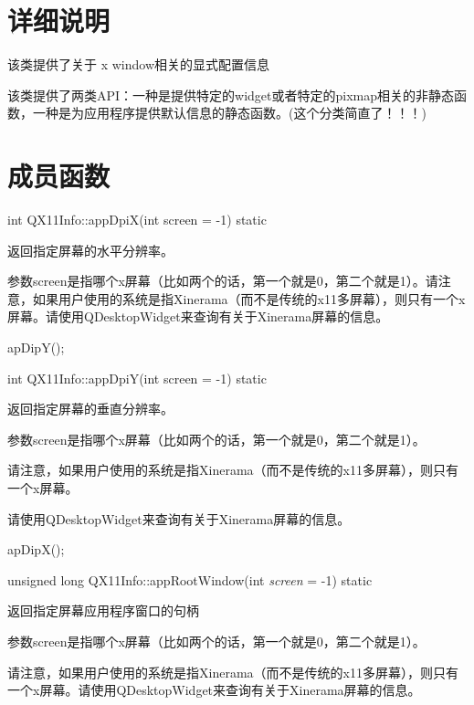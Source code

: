 \section{详细说明}

该类提供了关于 x window相关的显式配置信息

该类提供了两类API：一种是提供特定的widget或者特定的pixmap相关的非静态函数，一种是为应用程序提供默认信息的静态函数。(这个分类简直了！！！)

\section{成员函数}

\begin{itemSpace}
int QX11Info::appDpiX(int screen = -1) static

返回指定屏幕的水平分辨率。

参数screen是指哪个x屏幕（比如两个的话，第一个就是0，第二个就是1）。请注意，如果用户使用的系统是指Xinerama（而不是传统的x11多屏幕），则只有一个x屏幕。请使用QDesktopWidget来查询有关于Xinerama屏幕的信息。

\begin{seeAlso}
	apDipY();
\end{seeAlso}
\end{itemSpace}

\begin{itemSpace}
int QX11Info::appDpiY(int screen = -1) static

返回指定屏幕的垂直分辨率。

参数screen是指哪个x屏幕（比如两个的话，第一个就是0，第二个就是1）。

请注意，如果用户使用的系统是指Xinerama（而不是传统的x11多屏幕），则只有一个x屏幕。

请使用QDesktopWidget来查询有关于Xinerama屏幕的信息。

\begin{seeAlso}
	apDipX();
\end{seeAlso}
\end{itemSpace}


\begin{itemSpace}
	unsigned long QX11Info::appRootWindow(int \emph{screen} = -1) static

	返回指定屏幕应用程序窗口的句柄

	参数screen是指哪个x屏幕（比如两个的话，第一个就是0，第二个就是1）。

	请注意，如果用户使用的系统是指Xinerama（而不是传统的x11多屏幕），则只有一个x屏幕。请使用QDesktopWidget来查询有关于Xinerama屏幕的信息。
\end{itemSpace}


